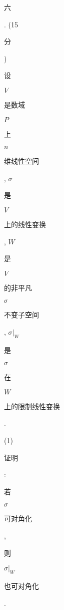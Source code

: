 \documentclass[10pt]{article}
\begin{document}
\begin{CJK}{UTF8}{mj}六\end{CJK}. (15 \begin{CJK}{UTF8}{mj}分\end{CJK}) \begin{CJK}{UTF8}{mj}设\end{CJK} $V$ \begin{CJK}{UTF8}{mj}是数域\end{CJK} $P$ \begin{CJK}{UTF8}{mj}上\end{CJK} $n$ \begin{CJK}{UTF8}{mj}维线性空间\end{CJK}, $\sigma$ \begin{CJK}{UTF8}{mj}是\end{CJK} $V$ \begin{CJK}{UTF8}{mj}上的线性变换\end{CJK}, $W$ \begin{CJK}{UTF8}{mj}是\end{CJK} $V$ \begin{CJK}{UTF8}{mj}的非平凡\end{CJK} $\sigma$ \begin{CJK}{UTF8}{mj}不变子空间\end{CJK}, $\left.\sigma\right|_{W}$ \begin{CJK}{UTF8}{mj}是\end{CJK} $\sigma$ \begin{CJK}{UTF8}{mj}在\end{CJK} $W$ \begin{CJK}{UTF8}{mj}上的限制线性变换\end{CJK}.

(1) \begin{CJK}{UTF8}{mj}证明\end{CJK}: \begin{CJK}{UTF8}{mj}若\end{CJK} $\sigma$ \begin{CJK}{UTF8}{mj}可对角化\end{CJK}, \begin{CJK}{UTF8}{mj}则\end{CJK} $\left.\sigma\right|_{W}$ \begin{CJK}{UTF8}{mj}也可对角化\end{CJK}.
\end{document}
